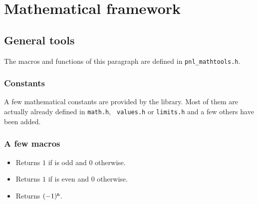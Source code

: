 \section{Mathematical framework}

\subsection{General tools}

The macros and functions of this paragraph are defined in \verb!pnl_mathtools.h!.

\subsubsection{Constants} A few mathematical constants are provided by the
library. Most of them are actually already defined in {\tt math.h}, {\tt
  values.h} or {\tt limits.h} and a few others have been added.
\begin{describeconst}
\end{describeconst}

\subsubsection{A few macros}
\begin{itemize}
\item {}
  \sshortdescribe Returns $1$ if  is odd and $0$ otherwise.
\item {}
  \sshortdescribe Returns $1$ if  is even and $0$ otherwise.
\item {}
  \sshortdescribe Returns $(-1)^{\tt n}$.
\end{itemize}

